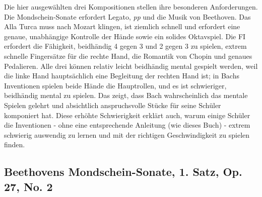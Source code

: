 Die hier ausgewählten drei Kompositionen stellen ihre besonderen Anforderungen.
Die Mondschein-Sonate erfordert Legato, \textit{pp} und die Musik von Beethoven.
Das Alla Turca muss nach Mozart klingen, ist ziemlich schnell und erfordert eine genaue, unabhängige Kontrolle der Hände sowie ein solides Oktavspiel.
Die FI erfordert die Fähigkeit, beidhändig 4 gegen 3 und 2 gegen 3 zu spielen, extrem schnelle Fingersätze für die rechte Hand, die Romantik von Chopin und genaues Pedalieren.
Alle drei können relativ leicht beidhändig mental gespielt werden, weil die linke Hand hauptsächlich eine Begleitung der rechten Hand ist; in Bachs Inventionen spielen beide Hände die Hauptrollen, und es ist schwieriger, beidhändig mental zu spielen.
Das zeigt, dass Bach wahrscheinlich das mentale Spielen gelehrt und absichtlich anspruchsvolle Stücke für seine Schüler komponiert hat.
Diese erhöhte Schwierigkeit erklärt auch, warum einige Schüler die Inventionen - ohne eine entsprechende Anleitung (wie dieses Buch) - extrem schwierig auswendig zu lernen und mit der richtigen Geschwindigkeit zu spielen finden.


\subsection{Beethovens Mondschein-Sonate, 1. Satz, Op. 27, No. 2}
\label{c1ii25b}

